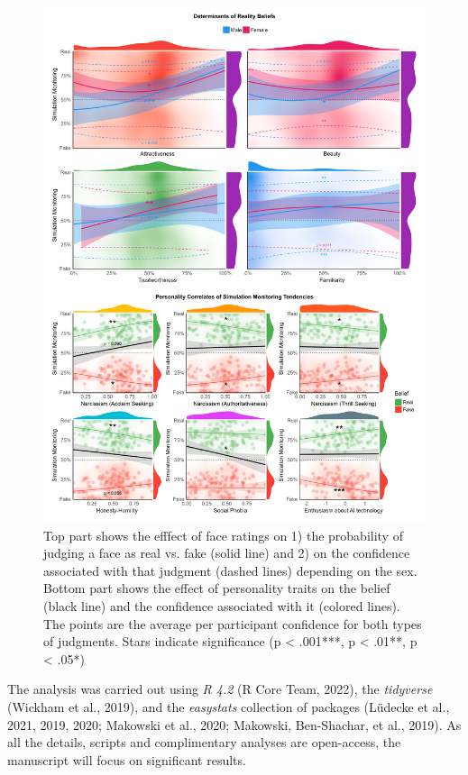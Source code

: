 \documentclass[
  man,floatsintext]{apa6}
\begin{document}
\begin{figure}
\includegraphics[width=1\linewidth]{../figures/Figure2} \caption{Top part shows the efffect of face ratings on 1) the probability of judging a face as real vs. fake (solid line) and 2) on the confidence associated with that judgment (dashed lines) depending on the sex. Bottom part shows the effect of personality traits on the belief (black line) and the confidence associated with it (colored lines). The points are the average per participant confidence for both types of judgments. Stars indicate significance (p < .001***, p < .01**, p < .05*)}\label{fig:unnamed-chunk-3}
\end{figure}

The analysis was carried out using \emph{R 4.2} (R Core Team, 2022), the \emph{tidyverse} (Wickham et al., 2019), and the \emph{easystats} collection of packages (Lüdecke et al., 2021, 2019, 2020; Makowski et al., 2020; Makowski, Ben-Shachar, et al., 2019). As all the details, scripts and complimentary analyses are open-access, the manuscript will focus on significant results.
\end{document}
